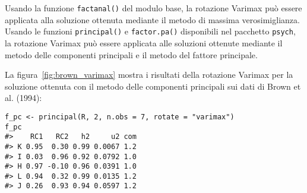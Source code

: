 







Usando la funzione \texttt{factanal()} del modulo base, la rotazione
Varimax può essere applicata alla soluzione ottenuta mediante il
metodo di massima verosimiglianza. Usando  le funzioni \texttt{principal()} e \texttt{factor.pa()} disponibili nel pacchetto \texttt{psych}, la  rotazione Varimax può essere applicata alle soluzioni ottenute mediante il metodo delle componenti principali e il metodo del fattore principale. 

La figura~\ref{fig:brown_varimax} mostra i risultati della rotazione Varimax per la soluzione ottenuta con il metodo delle componenti principali sui dati di Brown et al. (1994): 
\begin{lstlisting}
f_pc <- principal(R, 2, n.obs = 7, rotate = "varimax")
f_pc
#>    RC1   RC2   h2     u2 com
#> K 0.95  0.30 0.99 0.0067 1.2
#> I 0.03  0.96 0.92 0.0792 1.0
#> H 0.97 -0.10 0.96 0.0391 1.0
#> L 0.94  0.32 0.99 0.0135 1.2
#> J 0.26  0.93 0.94 0.0597 1.2
\end{lstlisting}

